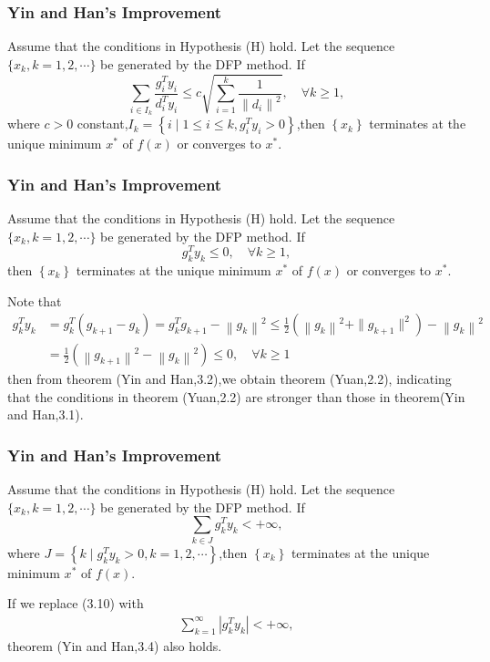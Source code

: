 \documentclass{beamer}
\begin{document}
\begin{frame}
\frametitle{Yin and Han's Improvement}
\begin{theorem}
Assume that the conditions in Hypothesis (H) hold. Let the sequence $\{x_{k}, k=1,2, \cdots\}$ be generated by the DFP method. If\begin{equation*}
    \sum_{i \in I_k} \frac{g_i^T y_i}{d_i^T y_i} \leq c \sqrt{\sum_{i=1}^k \frac{1}{\left\|d_i\right\|^2}}, \quad \forall k \geq 1,
\end{equation*}
where $c>0$ constant,$I_k=\left\{i \mid 1 \leq i \leq k, g_i^T y_i>0\right\}$,then $\left\{x_k\right\}$ terminates at the unique minimum $x^{*}$ of $f(x)$ or converges to $x^{*}$.
    
\end{theorem}
    
\end{frame}

\begin{frame}
\frametitle{Yin and Han's Improvement}
    \begin{theorem}
Assume that the conditions in Hypothesis (H) hold. Let the sequence $\{x_{k}, k=1,2, \cdots\}$ be generated by the DFP method. If \begin{equation*}
    g_k^T y_k \leq 0, \quad \forall k \geq 1,
\end{equation*}
then $\left\{x_k\right\}$ terminates at the unique minimum $x^{*}$ of $f(x)$ or converges to $x^{*}$.
\end{theorem}

Note that 
\begin{align*}
g_k^T y_k & =g_k^T\left(g_{k+1}-g_k\right)=g_k^T g_{k+1}-\left\|g_k\right\|^2 \leq \frac{1}{2}\left(\left\|g_k\right\|^2+\|g_{k+1} \|^2\right)-\left\|g_k\right\|^2 \\
& =\frac{1}{2}\left(\left\|g_{k+1}\right\|^2-\left\|g_k\right\|^2\right) \leq 0, \quad \forall k \geq 1
\end{align*}
then from theorem (Yin and Han,3.2),we obtain theorem (Yuan,2.2), indicating that the conditions in theorem (Yuan,2.2) are stronger than those in theorem(Yin and Han,3.1).
\end{frame}

\begin{frame}
\frametitle{Yin and Han's Improvement} 
\begin{theorem}
Assume that the conditions in Hypothesis (H) hold. Let the sequence $\{x_{k}, k=1,2, \cdots\}$ be generated by the DFP method. If \begin{equation*}
    \sum_{k \in J} g_k^T y_k<+\infty, \tag{3.10}
\end{equation*}
where $J=\left\{k \mid g_k^T y_k>0, k=1,2, \cdots\right\}$,then $\left\{x_k\right\}$ terminates at the unique minimum $x^{*}$ of $f(x)$.
\end{theorem}
If we replace (3.10) with
\begin{align*}
    \sum_{k=1}^{\infty}\left|g_k^T y_k\right|<+\infty, \tag{3.12}
\end{align*}
theorem (Yin and Han,3.4) also holds.
\end{frame}
\end{document}
